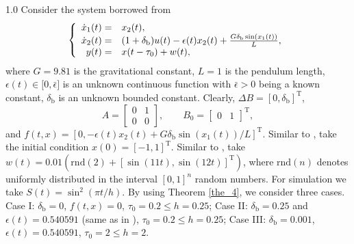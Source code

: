 \documentclass[journal]{IEEEtran}
\begin{document}
\begin{spacing}{1.0}
Consider the system borrowed from \cite{Mazenc25acc,Mazenc25tac}
\begin{equation}
\left\{
\begin{array}
[c]{rl}%
\dot{x}_{1}(t)= & x_{2}(t),\\
\dot{x}_{2}(t)= & (1+\delta_{\mathrm{b}})u(t)-\epsilon(t)x_{2}(t)+\frac
{G\delta_{\mathrm{b}}\sin(x_{1}(t))}{L},\\
y(t)= & x(t-\tau_{0})+w(t),
\end{array}
\right.  \label{sys_simu}%
\end{equation}
where $G=9.81$ is the gravitational constant, $L=1$ is the pendulum length,
$\epsilon(t)\in\lbrack0,\bar{\epsilon}]$ is an unknown
continuous function with $\bar{\epsilon}>0$ being a known constant,
$\delta_{\mathrm{b}}$ is an unknown bounded constant. Clearly,
$\mathit{\Delta}B=[0,\delta_{\mathrm{b}}]^{\mathrm{T}}$,
\[
A=\begin{bmatrix}0&1\\0&0\end{bmatrix},
\qquad
B_{0}=\begin{bmatrix}0&1\end{bmatrix}^{\mathrm T},
\]
and
$f(t,x)=[0,-\epsilon(t)x_{2}(t)+G\delta_{\mathrm{b}}
\sin(x_{1}(t))/L]^{\mathrm{T}}$.
Similar to \cite{Mazenc25tac}, take the initial condition
$x(0)=[-1,1]^{\mathrm{T}}$. Similar to \cite{Wang24auto,Zime25auto},
take $w(t)=0.01(\mathrm{rnd}(2)+[\sin(11t),\sin(12t)]^{\mathrm{T}})$, where
$\mathrm{rnd}(n)$ denotes uniformly distributed in the interval $[0,1]^{n}$
random numbers. For simulation we take $S(t)=\sin^2(\pi t/h)$. By using
Theorem \ref{the_4}, we consider three cases. Case I:
$\delta_{\mathrm{b}}=0$, $f(t,x)=0$, $\tau_{0}=0.2\leq h=0.25$; Case II:
$\delta_{\mathrm{b}}=0.25$ and $\epsilon(t)=0.540591$ (same as in
\cite{Mazenc25tac}), $\tau_{0}=0.2\leq h=0.25$; Case III:
$\delta_{\mathrm{b}}=0.001$, $\epsilon(t)=0.540591$,
$\tau_{0}=2\leq h=2$.


\end{spacing}
\end{document}
